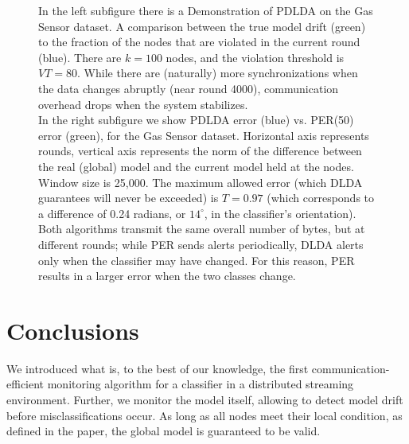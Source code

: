 \begin{figure}[t]
\centering

\qquad
{}

\caption{In the left subfigure there is a Demonstration of PDLDA on the Gas Sensor dataset.
A comparison between the true model drift (green) to the fraction of the nodes that
are violated in the current round (blue).
There are $k=100$ nodes, and the violation threshold is
$VT=80$. While there are (naturally) more synchronizations when the data
changes abruptly (near round 4000), communication overhead drops when the
system stabilizes.
\\ In the right subfigure we show  PDLDA error (blue) vs. PER(50) error (green), for the Gas Sensor dataset. Horizontal axis represents rounds, vertical
	axis represents the norm of the difference between the real (global) model and the current model held at the nodes. Window size is 25,000.
	The maximum allowed error (which DLDA guarantees will never be
	exceeded) is $T = 0.97$ (which corresponds to a difference of
	0.24 radians, or $14^{\circ}$, in the classifier's orientation). Both
	algorithms transmit the same overall number of bytes, but at different
	rounds; while PER sends alerts periodically, DLDA alerts only when the 
	classifier may have changed. For this reason, PER results in a larger
	error when the two classes change. }
\label{BigGasOverTime}%
\end{figure}





\section*{Conclusions}
We introduced what is, to the best of our knowledge, the first communication-efficient monitoring algorithm for a classifier in a distributed streaming environment. 
Further, we monitor the
model itself, allowing to detect model drift before misclassifications occur.
As long as all nodes meet their local condition, as defined in
the paper, the
global model is guaranteed to be valid. 

